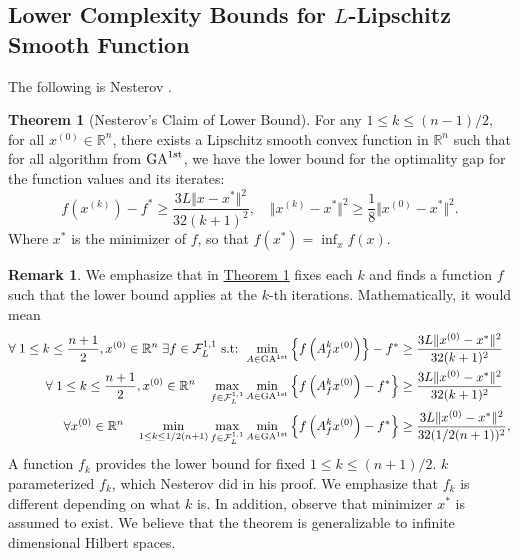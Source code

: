 \documentclass[]{article}
\theoremstyle{definition}
\newtheorem{theorem}{Theorem}[subsection]       %
\newtheorem{remark}{Remark}[subsection]
{
    \newtheorem{assumption}{Assumption}
}
\numberwithin{equation}{subsection}
\begin{document}
    \subsection{Lower Complexity Bounds for $L$-Lipschitz Smooth Function}
        The following is Nesterov \cite[Thm 2.1.7]{nesterov_lecture_2018}. 
        \begin{theorem}[Nesterov's Claim of Lower Bound]\label{thm:nesterov_lower_bnd}
            For any $1\le k \le (n - 1)/2$, for all $x^{(0)}\in \mathbb R^n$, there exists a Lipschitz smooth convex function in $\mathbb R^n$ such that for all algorithm from $\text{GA}^{\text{1st}}$, we have the lower bound for the optimality gap for the function values and its iterates: 
            \[
                f\left(x^{(k)}\right) - f^* \ge 
                \frac{3L \Vert x - x^*\Vert^2}{32(k + 1)^2}, 
                \quad \Vert x^{(k)} - x^*\Vert^2 \ge \frac{1}{8} \Vert x^{(0)} - x^*\Vert^2.     
            \]
            Where $x^*$ is the minimizer of $f$, so that $f(x^*) = \inf_{x}f(x)$. 
        \end{theorem}
        \begin{remark}
            We emphasize that in \hyperref[thm:nesterov_lower_bnd]{Theorem \ref*{thm:nesterov_lower_bnd}} fixes each $k$ and finds a function $f$ such that the lower bound applies at the $k$-th iterations. 
            Mathematically, it would mean 
            \begin{align*}
                \forall\; 1\le k \le \frac{n + 1}{2}, x^{(0)} \in \mathbb R^n\; 
                \exists f \in \mathcal F^{1, 1}_L \text{ s.t: }
                \min_{A\in \text{GA}^{\text{1st}}} 
                \left\lbrace
                    f\left(A_f^k x^{(0)}\right)
                \right\rbrace - f^* 
                &\ge 
                \frac{3L \Vert x^{(0)} - x^*\Vert^2}{32(k + 1)^2}
                \\
                \forall\; 1\le k \le \frac{n + 1}{2}, x^{(0)} \in \mathbb R^n
                \quad
                \max_{f\in \mathcal F_L^{1,1}}
                \min_{A\in \text{GA}^{\text{1st}}} 
                \left\lbrace
                    f\left(A_f^k x^{(0)}\right) - f^*  
                \right\rbrace 
                &\ge 
                \frac{3L \Vert x^{(0)} - x^*\Vert^2}{32(k + 1)^2}
                \\
                \forall
                x^{(0)} \in \mathbb R^n \quad 
                \min_{1 \le k \le 1/2 (n + 1)}
                \max_{f\in \mathcal F_L^{1, 1}}
                \min_{ A \in \text{GA}^{\text{1st}}}
                \left\lbrace
                    f\left(A_f^kx^{(0)}\right) - f^*
                \right\rbrace
                & \ge 
                \frac{3L \Vert x^{(0)} - x^*\Vert^2}{32(1/2(n + 1))^2}, 
            \end{align*}
            A function $f_k$ provides the lower bound for fixed $1 \le k \le (n+ 1)/2$. 
            $k$ parameterized $f_k$, which Nesterov did in his proof. 
            We emphasize that $f_k$ is different depending on what $k$ is. 
            In addition, observe that minimizer $x^*$ is assumed to exist. 
            We believe that the theorem is generalizable to infinite dimensional Hilbert spaces. 
        \end{remark}
\end{document}

